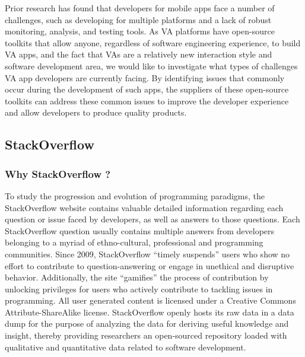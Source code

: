 \documentclass{sigchi}
\begin{document}
Prior research \cite{4joorabchi2013real} has found that developers for mobile apps face a number of challenges, such as developing for multiple platforms and a lack of robust monitoring, analysis, and testing tools. As VA platforms have open-source toolkits that allow anyone, regardless of software engineering experience, to build VA apps, and the fact that VAs are a relatively new interaction style and software development area, we would like to investigate what types of challenges VA app developers are currently facing. By identifying issues that commonly occur during the development of such apps, the suppliers of these open-source toolkits can address these common issues to improve the developer experience and allow developers to produce quality products.


\subsection{StackOverflow}
\subsubsection{Why StackOverflow ?}
To study the progression and evolution of programming paradigms, the StackOverflow website contains valuable detailed information regarding each question or issue faced by developers, as well as answers to those questions. Each StackOverflow question usually contains multiple answers from developers belonging to a myriad of ethno-cultural, professional and programming communities. Since 2009, StackOverflow ``timely suspends'' users who show no effort to contribute to question-answering or engage in unethical and disruptive behavior. Additionally, the site ``gamifies'' the process of contribution by unlocking privileges for users who actively contribute to tackling issues in programming. All user generated content is licensed under a Creative Commons Attribute-ShareAlike license. StackOverflow openly hosts its raw data in a data dump for the purpose of analyzing the data for deriving useful knowledge and insight, thereby providing researchers an open-sourced repository loaded with qualitative and quantitative data related to software development.
\end{document}
